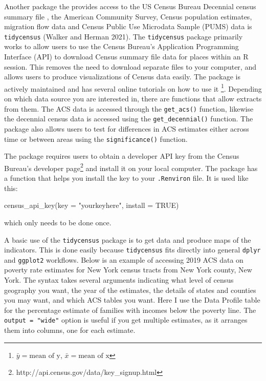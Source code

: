 \documentclass[
  letterpaper,
  DIV=11,
  numbers=noendperiod]{scrreprt}
\newenvironment{Shaded}{\begin{snugshade}}{\end{snugshade}}
\newcommand{\AttributeTok}[1]{\textcolor[rgb]{0.40,0.45,0.13}{#1}}
\newcommand{\ConstantTok}[1]{\textcolor[rgb]{0.56,0.35,0.01}{#1}}
\newcommand{\FunctionTok}[1]{\textcolor[rgb]{0.28,0.35,0.67}{#1}}
\newcommand{\NormalTok}[1]{\textcolor[rgb]{0.00,0.23,0.31}{#1}}
\newcommand{\StringTok}[1]{\textcolor[rgb]{0.13,0.47,0.30}{#1}}
\begin{document}
Another package the provides access to the US Census Bureau Decennial
census summary file , the American Community Survey, Census population
estimates, migration flow data and Census Public Use Microdata Sample
(PUMS) data is \texttt{tidycensus} (Walker and Herman 2021). The
\texttt{tidycensus} package primarily works to allow users to use the
Census Bureau's Application Programming Interface (API) to download
Census summary file data for places within an R session. This removes
the need to download separate files to your computer, and allows users
to produce visualizations of Census data easily. The package is actively
maintained and has several online tutorials on how to use it
\footnote{\(\bar{y}= \text{mean of y}\), \(\bar{x}= \text{mean of x}\)}.
Depending on which data source you are interested in, there are
functions that allow extracts from them. The ACS data is accessed
through the \texttt{get\_acs()} function, likewise the decennial census
data is accessed using the \texttt{get\_decennial()} function. The
package also allows users to test for differences in ACS estimates
either across time or between areas using the \texttt{significance()}
function.

The package requires users to obtain a developer API key from the Census
Bureau's developer page\footnote{http://api.census.gov/data/key\_signup.html}
and install it on your local computer. The package has a function that
helps you install the key to your \texttt{.Renviron} file. It is used
like this:

\begin{Shaded}
\begin{Highlighting}[]
\FunctionTok{census\_api\_key}\NormalTok{(}\AttributeTok{key =} \StringTok{"yourkeyhere"}\NormalTok{, }\AttributeTok{install =} \ConstantTok{TRUE}\NormalTok{)}
\end{Highlighting}
\end{Shaded}

which only needs to be done once.

A basic use of the \texttt{tidycensus} package is to get data and
produce maps of the indicators. This is done easily because
\texttt{tidycensus} fits directly into general \texttt{dplyr} and
\texttt{ggplot2} workflows. Below is an example of accessing 2019 ACS
data on poverty rate estimates for New York census tracts from New York
county, New York. The syntax takes several arguments indicating what
level of census geography you want, the year of the estimates, the
details of states and counties you may want, and which ACS tables you
want. Here I use the Data Profile table for the percentage estimate of
families with incomes below the poverty line. The
\texttt{output\ =\ "wide"} option is useful if you get multiple
estimates, as it arranges them into columns, one for each estimate.
\end{document}
